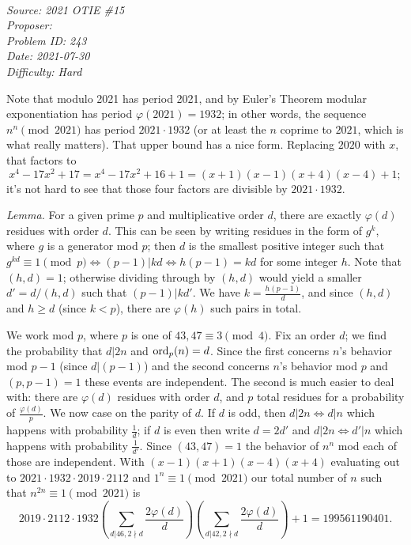 \SSbreak\\
\emph{Source: 2021 OTIE \#15}\\
\emph{Proposer: \Pnjoy}\\ %
\emph{Problem ID: 243}\\
\emph{Date: 2021-07-30}\\
\emph{Difficulty: Hard}\\
\SSbreak

\bigskip

\begin{solution}\hfil\medskip
  
    Note that modulo 2021 has period 2021, and by Euler's Theorem modular exponentiation has 
    period $\varphi(2021) = 1932$; in other words, the sequence $n^n \pmod{2021}$ has 
    period $2021 \cdot 1932$ (or at least the $n$ coprime to $2021$, which is what really matters).
    That upper bound has a nice form. Replacing $2020$ with $x$, that factors to 
    $$x^4 - 17x^2 + 17 = x^4 - 17x^2 + 16 + 1 = (x + 1)(x - 1)(x + 4)(x - 4) + 1;$$
    it's not hard to see that those four factors are divisible by $2021 \cdot 1932.$ \medskip

    \textit{Lemma.} For a given prime $p$ and multiplicative order $d$, there are exactly 
    $\varphi(d)$ residues with order $d$. This can be seen by writing residues in the form of 
    $g^k$, where $g$ is a generator mod $p$; then $d$ is the smallest positive integer such that 
    $g^{kd} \equiv 1 \pmod{p} \iff (p - 1)|kd \iff h(p - 1) = kd$ for some integer $h$. 
    Note that $(h, d) = 1$; otherwise dividing through by $(h, d)$ would yield a smaller 
    $d' = d/(h, d)$ such that $(p - 1)|kd'.$ We have $k = \frac{h(p - 1)}{d}$, and since $(h, d)$ 
    and $h \geq d$ (since $k < p$), there are $\varphi(h)$ such pairs in total. \medskip

    We work mod $p$, where $p$ is one of $43, 47 \equiv 3 \pmod{4}$. Fix an order $d$; we find the probability that $d|2n$ and $\operatorname{ord}_p(n) = d$. Since the first concerns 
    $n$'s behavior mod $p - 1$ (since $d|(p - 1)$) and the second concerns $n$'s behavior mod $p$ and 
    $(p, p - 1) = 1$ these events are independent. The second is much easier to deal with: there are 
    $\varphi(d)$ residues with order $d$, and $p$ total residues for a probability of $\frac{\varphi(d)}{p}$. 
    We now case on the parity of $d$. If $d$ is odd, then $d|2n \iff d|n$ which happens with probability $\frac1d$; 
    if $d$ is even then write $d = 2d'$ and $d|2n \iff d'|n$ which happens with probability $\frac{1}{d'}$. 
    Since $(43, 47) = 1$ the behavior of $n^n$ mod each of those are independent. With $(x - 1)(x + 1)(x - 4)(x + 4)$ 
    evaluating out to $2021 \cdot 1932 \cdot 2019 \cdot 2112$ and $1^n \equiv 1 \pmod{2021}$ 
    our total number of $n$ such that $n^{2n} \equiv 1 \pmod{2021}$ is 
    $$2019 \cdot 2112 \cdot 1932 \left(\sum_{d|46, 2\nmid d} \dfrac{2\varphi(d)}{d}\right)\left(\sum_{d|42, 2\nmid d} \dfrac{2\varphi(d)}{d}\right) + 1 = \boxed{199561190401}.$$ \medskip


\end{solution}
